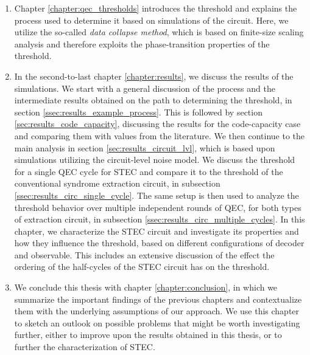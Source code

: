 \begin{enumerate}
    \item Chapter \ref{chapter:qec_thresholds} introduces the threshold and explains the process used to determine it based on simulations of the circuit. 
    Here, we utilize the so-called \emph{data collapse method}, which is based on finite-size scaling analysis and therefore exploits the phase-transition properties of the threshold.

    \item In the second-to-last chapter \ref{chapter:results}, we discuss the results of the simulations.
    We start with a general discussion of the process and the intermediate results obtained on the path to determining the threshold, in section \ref{ssec:results_example_process}.
    This is followed by section \ref{sec:results_code_capacity}, discussing the results for the code-capacity case and comparing them with values from the literature. 
    We then continue to the main analysis in section \ref{sec:results_circuit_lvl}, which is based upon simulations utilizing the circuit-level noise model. 
    We discuss the threshold for a single QEC cycle for STEC and compare it to the threshold of the conventional syndrome extraction circuit, in subsection \ref{ssec:results_circ_single_cycle}.
    The same setup is then used to analyze the threshold behavior over multiple independent rounds of QEC, for both types of extraction circuit, in subsection \ref{ssec:results_circ_multiple_cycles}. 
    In this chapter, we characterize the STEC circuit and investigate its properties and how they influence the threshold, based on different configurations of decoder and observable. 
    This includes an extensive discussion of the effect the ordering of the half-cycles of the STEC circuit has on the threshold.  

    \item We conclude this thesis with chapter \ref{chapter:conclusion}, in which we summarize the important findings of the previous chapters and contextualize them with the underlying assumptions of our approach.
    We use this chapter to sketch an outlook on possible problems that might be worth investigating further, either to improve upon the results obtained in this thesis, 
    or to further the characterization of STEC.

\end{enumerate}
